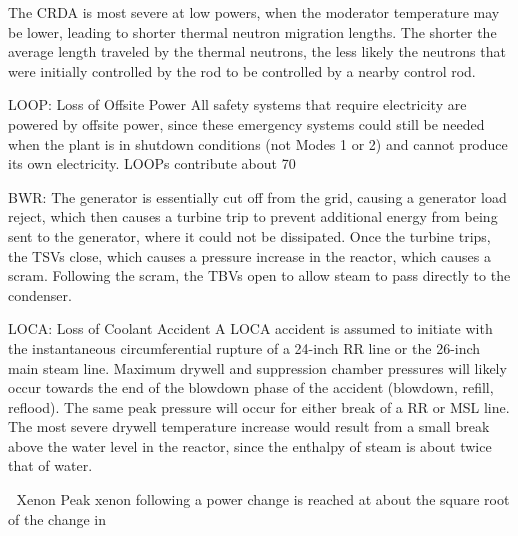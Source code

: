 \documentclass[10pt]{article}
\begin{document}
The CRDA is most severe at low powers, when the moderator temperature may be lower, leading to shorter thermal neutron migration lengths. The shorter the average length traveled by the thermal neutrons, the less likely the neutrons that were initially controlled by the rod to be controlled by a nearby control rod. 

LOOP: Loss of Offsite Power
All safety systems that require electricity are powered by offsite power, since these emergency systems could still be needed when the plant is in shutdown conditions (not Modes 1 or 2) and cannot produce its own electricity. LOOPs contribute about 70%

BWR: The generator is essentially cut off from the grid, causing a generator load reject, which then causes a turbine trip to prevent additional energy from being sent to the generator, where it could not be dissipated. Once the turbine trips, the TSVs close, which causes a pressure increase in the reactor, which causes a scram. Following the scram, the TBVs open to allow steam to pass directly to the condenser. 

LOCA: Loss of Coolant Accident
A LOCA accident is assumed to initiate with the instantaneous circumferential rupture of a 24-inch RR line or the 26-inch main steam line. Maximum drywell and suppression chamber pressures will likely occur towards the end of the blowdown phase of the accident (blowdown, refill, reflood). The same peak pressure will occur for either break of a RR or MSL line. The most severe drywell temperature increase would result from a small break above the water level in the reactor, since the enthalpy of steam is about twice that of water. 




Xenon
Peak xenon following a power change is reached at about the square root of the change in %
\end{document}
